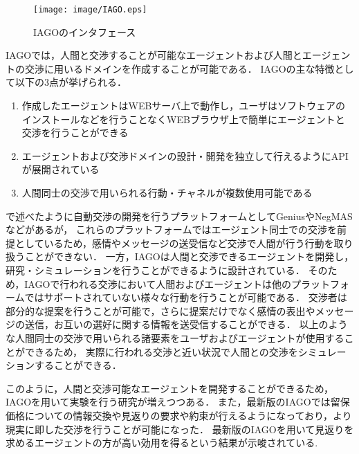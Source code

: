 \begin{figure}[htb]
    \centering
    \texttt{[image: image/IAGO.eps]}
    \caption{IAGOのインタフェース}
    \label{fig:iago}
\end{figure}

IAGOでは，人間と交渉することが可能なエージェントおよび人間とエージェントの交渉に用いるドメインを作成することが可能である．
IAGOの主な特徴として以下の3点が挙げられる\cite{pinocchio}．

\begin{enumerate}
    \item 作成したエージェントはWEBサーバ上で動作し，ユーザはソフトウェアのインストールなどを行うことなくWEBブラウザ上で簡単にエージェントと交渉を行うことができる
    \item エージェントおよび交渉ドメインの設計・開発を独立して行えるようにAPIが展開されている
    \item 人間同士の交渉で用いられる行動・チャネルが複数使用可能である
\end{enumerate}

で述べたように自動交渉の開発を行うプラットフォームとしてGenius\cite{genius}やNegMAS\cite{negmas}などがあるが，
これらのプラットフォームではエージェント同士での交渉を前提としているため，感情やメッセージの送受信など交渉で人間が行う行動を取り扱うことができない．
一方，IAGOは人間と交渉できるエージェントを開発し，研究・シミュレーションを行うことができるように設計されている．
そのため，IAGOで行われる交渉において人間およびエージェントは他のプラットフォームではサポートされていない様々な行動を行うことが可能である．
交渉者は部分的な提案を行うことが可能で，さらに提案だけでなく感情の表出やメッセージの送信，お互いの選好に関する情報を送受信することができる．
以上のような人間同士の交渉で用いられる諸要素をユーザおよびエージェントが使用することができるため，
実際に行われる交渉と近い状況で人間との交渉をシミュレーションすることができる．

このように，人間と交渉可能なエージェントを開発することができるため，IAGOを用いて実験を行う研究が増えつつある．
また，最新版のIAGOでは留保価格についての情報交換や見返りの要求や約束が行えるようになっており，より現実に即した交渉を行うことが可能になった．
最新版のIAGOを用いて見返りを求めるエージェントの方が高い効用を得るという結果が示唆されている\cite{favor}.


